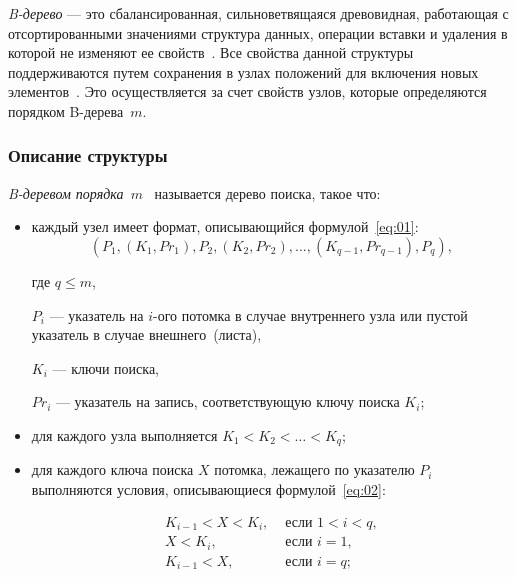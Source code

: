 \textit{B-дерево} --- это сбалансированная, сильноветвящаяся древовидная,
работающая с отсортированными значениями структура данных, операции вставки и
удаления в которой не изменяют ее свойств~\cite{loshad}. Все свойства данной
структуры поддерживаются путем сохранения в узлах положений для включения новых
элементов~\cite{baw}. Это осуществляется за счет свойств узлов, которые
определяются порядком B-дерева~$m$.

\subsubsection{Описание структуры}

\textit{B-деревом порядка~$m$}~\cite{baw, arki} называется дерево поиска, такое
что:

\begin{itemize}
    \item каждый узел имеет формат, описывающийся формулой~\ref{eq:01}:
        \begin{equation}\label{eq:01}
            (P_1, (K_1, Pr_1), P_2, (K_2, Pr_2), \dots, (K_{q-1}, Pr_{q-1}),
            P_q),
        \end{equation}

        где $q \leqslant m$,

        $P_i$ --- указатель на $i$-ого потомка в случае внутреннего узла или
        пустой указатель в случае внешнего~(листа),

        $K_i$ --- ключи поиска,

        $Pr_i$ --- указатель на запись, соответствующую ключу поиска $K_i$;

    \item для каждого узла выполняется $K_1 < K_2 < \dots < K_q$;

    \item для каждого ключа поиска $X$ потомка, лежащего по указателю $P_i$
        выполняются условия, описывающиеся формулой~\ref{eq:02}:

        \begin{equation}\label{eq:02}
            \begin{aligned}
                K_{i-1} < X < K_i, & \text{ если } 1 < i < q,\\
                X < K_i, & \text{ если } i = 1,\\
                K_{i-1} < X, & \text{ если } i = q;
            \end{aligned}
        \end{equation}


\end{itemize}
